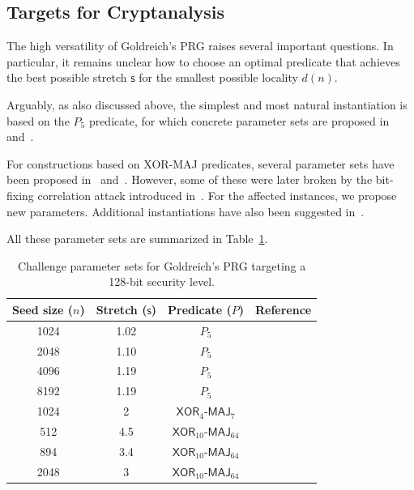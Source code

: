 \subsection{Targets for Cryptanalysis}
The high versatility of Goldreich's PRG raises several important questions. In particular, it remains unclear how to choose an optimal predicate that achieves the best possible stretch $\mathsf{s}$ for the smallest possible locality $d(n)$.

Arguably, as also discussed above, the simplest and most natural instantiation is based on the $P_5$ predicate, for which concrete parameter sets are proposed in~\cite{DBLP:journals/tit/YangGJL22} and~\cite{DBLP:conf/eurocrypt/AgarwalBBS25}.

For constructions based on \textsf{XOR-MAJ} predicates, several parameter sets have been proposed in~\cite{DBLP:conf/eurocrypt/AgarwalBBS25} and~\cite{EC:BCMPR24}. However, some of these were later broken by the bit-fixing correlation attack introduced in~\cite{EPRINT:FLLL24}. For the affected instances, we propose new parameters. Additional instantiations have also been suggested in~\cite{AC:CDDKS24}.

All these parameter sets are summarized in Table~\ref{tab:paramgar}.

\begin{table}[!ht]
  \centering
  \begin{tabular}{cccc}
    \toprule
    Seed size ($n$) & Stretch ($\mathsf{s}$) & Predicate ($P$)& Reference\\
    \midrule
    1024 & 1.02 & $P_5$ & \multirow{3}{*}{\cite{DBLP:journals/tit/YangGJL22}} \\
    2048 & 1.10 & $P_5$ &  \\
    4096 & 1.19 & $P_5$ &  \\
    \midrule
    8192 & 1.19 & $P_5$ & \multirow{2}{*}{\cite{DBLP:conf/eurocrypt/AgarwalBBS25}} \\
    1024 & 2 & $\mathsf{XOR}_4\textsf{-}\mathsf{MAJ}_7$ &  \\
    \midrule
    512 & 4.5 & $\mathsf{XOR}_{10}\textsf{-}\mathsf{MAJ}_{64}$ & \cite{EC:BCMPR24, EPRINT:FLLL24} \\
    \midrule
    894 & 3.4 & $\mathsf{XOR}_{10}\textsf{-}\mathsf{MAJ}_{64}$ & \multirow{2}{*}{\cite{AC:CDDKS24}} \\
    2048 & 3 & $\mathsf{XOR}_{10}\textsf{-}\mathsf{MAJ}_{64}$ &  \\
    \bottomrule
  \end{tabular}
  \caption{\label{tab:paramgar}Challenge parameter sets for Goldreich's PRG targeting a 128-bit security level.}
\end{table}


